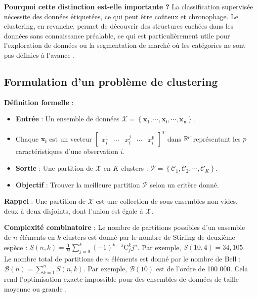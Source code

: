 \documentclass[10pt,a4paper]{article}
\begin{document}
\textbf{Pourquoi cette distinction est-elle importante ?}
La classification supervisée nécessite des données étiquetées, ce qui peut être coûteux et chronophage. Le clustering, en revanche, permet de découvrir des structures cachées dans les données sans connaissance préalable, ce qui est particulièrement utile pour l'exploration de données ou la segmentation de marché où les catégories ne sont pas définies à l'avance \cite{scikit-learn-clustering}.

\subsection*{Formulation d'un problème de clustering}

\textbf{Définition formelle} :
\begin{itemize}
    \item \textbf{Entrée} : Un ensemble de données $\mathcal{X}=\left\{\mathbf{x}_{1}, \cdots, \mathbf{x}_{\mathbf{i}}, \cdots, \mathbf{x}_{\mathbf{n}}\right\}$.
    \item Chaque $\mathbf{x}_{\mathbf{i}}$ est un vecteur $\left[\begin{array}{llllll}x_{i}^{1} & \cdots & x_{i}^{j} & \cdots & x_{i}^{p}\end{array}\right]^{T}$ dans $\mathbb{R}^{p}$ représentant les $p$ caractéristiques d'une observation $i$.
    \item \textbf{Sortie} : Une partition de $\mathcal{X}$ en $K$ clusters : $\mathcal{P}=\left\{\mathcal{C}_{1}, \mathcal{C}_{2}, \cdots, \mathcal{C}_{K}\right\}$.
    \item \textbf{Objectif} : Trouver la meilleure partition $\mathcal{P}$ selon un critère donné.
\end{itemize}

\textbf{Rappel} : Une partition de $\mathcal{X}$ est une collection de sous-ensembles non vides, deux à deux disjoints, dont l'union est égale à $\mathcal{X}$.

\textbf{Complexité combinatoire} :
Le nombre de partitions possibles d'un ensemble de $n$ éléments en $k$ clusters est donné par le nombre de Stirling de deuxième espèce : $S(n, k)=\frac{1}{k!} \sum_{j=0}^{k}(-1)^{k-j} \mathrm{C}_{j}^{k} j^{n}$. Par exemple, $S(10,4)=34,105$. Le nombre total de partitions de $n$ éléments est donné par le nombre de Bell : $\mathcal{B}(n)=\sum_{k=1}^{n} S(n, k)$. Par exemple, $\mathcal{B}(10)$ est de l'ordre de 100 000. Cela rend l'optimisation exacte impossible pour des ensembles de données de taille moyenne ou grande \cite{wikipedia-clustering}.
\end{document}
